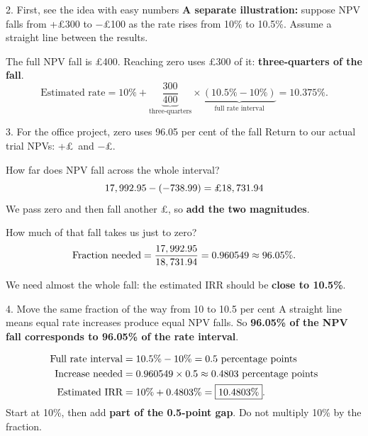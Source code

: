 \documentclass[9pt,aspectratio=169]{beamer}
\begin{document}
\begin{frame}{2. First, see the idea with easy numbers}
\textbf{A separate illustration:} suppose NPV falls from +£300 to −£100 as the rate rises from 10\% to 10.5\%. Assume a straight line between the results.
\begin{center}\end{center}
The full NPV fall is £400. Reaching zero uses £300 of it: \textbf{three-quarters of the fall}.
\[
\text{Estimated rate}=10\%+\underbrace{\frac{300}{400}}_{\text{three-quarters}}\times
\underbrace{(10.5\%-10\%)}_{\text{full rate interval}}=10.375\%.
\]
\end{frame}

\begin{frame}{3. For the office project, zero uses 96.05 per cent of the fall}
Return to our actual trial NPVs: +£\InterpPositive\ and −£\InterpNegative.
\begin{block}{How far does NPV fall across the whole interval?}
\[
17,992.95-(-738.99)=\text{£}18,731.94
\]
We pass zero and then fall another £\InterpNegative, so \textbf{add the two magnitudes}.
\end{block}
\begin{block}{How much of that fall takes us just to zero?}
\[
\text{Fraction needed}=\frac{17,992.95}{18,731.94}=0.960549\approx96.05\%.
\]
\end{block}
We need almost the whole fall: the estimated IRR should be \textbf{close to 10.5\%}.
\end{frame}

\begin{frame}{4. Move the same fraction of the way from 10 to 10.5 per cent}
A straight line means equal rate increases produce equal NPV falls. So \textbf{96.05\% of the NPV fall corresponds to 96.05\% of the rate interval}.
\begin{center}\end{center}
\[
\begin{aligned}
\text{Full rate interval}&=10.5\%-10\%=0.5\text{ percentage points}\\
\text{Increase needed}&=0.960549\times0.5\approx0.4803\text{ percentage points}\\
\text{Estimated IRR}&=10\%+0.4803\%=\boxed{10.4803\%}.
\end{aligned}
\]
Start at 10\%, then add \textbf{part of the 0.5-point gap}. Do not multiply 10\% by the fraction.
\end{frame}
\end{document}
